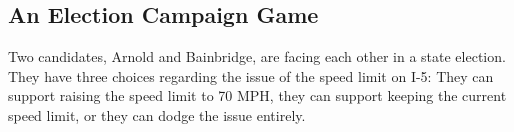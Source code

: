 

\subsection{An Election Campaign Game}\label{Ex:election}




Two candidates, Arnold and Bainbridge, are facing each other in a state election. They have three choices regarding the issue of the speed limit on I-5: They can support raising the speed limit to 70 MPH, they can support keeping the current speed limit, or they can dodge the issue entirely. 


